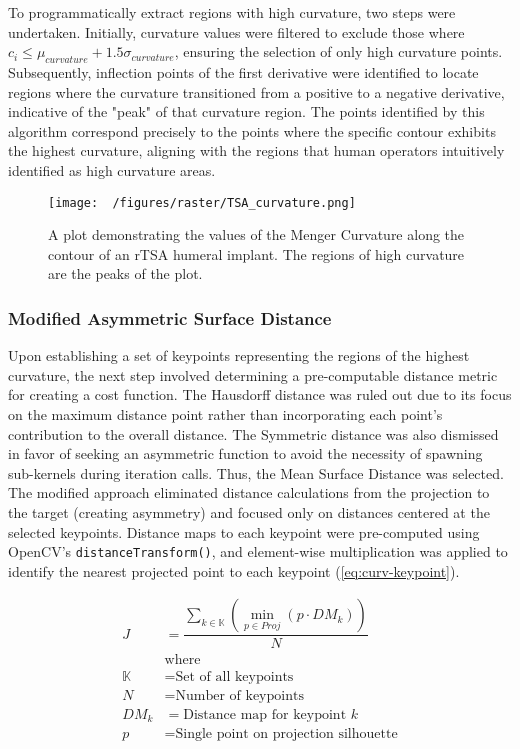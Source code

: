 To programmatically extract regions with high curvature, two steps were undertaken.
Initially, curvature values were filtered to exclude those where $c_{i} \le \mu_{curvature} + 1.5\sigma_{curvature}$, ensuring the selection of only high curvature points.
Subsequently, inflection points of the first derivative were identified to locate regions where the curvature transitioned from a positive to a negative derivative, indicative of the "peak" of that curvature region.
The points identified by this algorithm correspond precisely to the points where the specific contour exhibits the highest curvature, aligning with the regions that human operators intuitively identified as high curvature areas.


\begin{figure}[h!]
  \centering
  \texttt{[image: ~/figures/raster/TSA\_curvature.png]}
  \caption{A plot demonstrating the values of the Menger Curvature along the contour of an rTSA humeral implant. The regions of high curvature are the peaks of the plot.}
  \label{fig:tsa-curv}
\end{figure}



\subsubsection{Modified Asymmetric Surface Distance}
Upon establishing a set of keypoints representing the regions of the highest curvature, the next step involved determining a pre-computable distance metric for creating a cost function.
The Hausdorff distance was ruled out due to its focus on the maximum distance point rather than incorporating each point's contribution to the overall distance.
The Symmetric distance was also dismissed in favor of seeking an asymmetric function to avoid the necessity of spawning sub-kernels during iteration calls.
Thus, the Mean Surface Distance was selected.
The modified approach eliminated distance calculations from the projection to the target (creating asymmetry) and focused only on distances centered at the selected keypoints.
Distance maps to each keypoint were pre-computed using OpenCV's \texttt{distanceTransform()}, and element-wise multiplication was applied to identify the nearest projected point to each keypoint (\cref{eq:curv-keypoint}).

\begin{equation}
  \label{eq:curv-keypoint}
  \begin{split}
    \displaystyle J &= \dfrac{\sum_{k \in \mathbb{K}}(\min_{p\in Proj}(p \cdot DM_{k}))}{N} \\
      &\text{where}\\
    \mathbb{K} &= \text{Set of all keypoints} \\
    N &= \text{Number of keypoints} \\
    DM_{k} &= \text{Distance map for keypoint $k$} \\
    p &= \text{Single point on projection silhouette}
  \end{split}
\end{equation}

